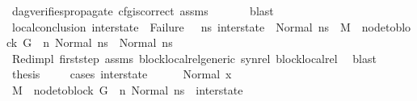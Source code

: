 \begin{isabellebody}
\ dag{\isacharunderscore}{\kern0pt}verifies{\isacharunderscore}{\kern0pt}propagate{\isacharunderscore}{\kern0pt}{}\ cfg{\isacharunderscore}{\kern0pt}is{\isacharunderscore}{\kern0pt}correct\ assms{\isacharparenleft}{\kern0pt}{}{\isacharparenright}{\kern0pt}\ \isanewline
\ \ \ \ \isamarkupfalse%
\ blast\isanewline
\ \ \isamarkupfalse%
\ local{\isacharunderscore}{\kern0pt}conclusion{\isacharcolon}{\kern0pt}\ {\isachardoublequoteopen}inter{\isacharunderscore}{\kern0pt}state\ {\isasymnoteq}\ Failure\ \ {\isasymand}\ {\isacharparenleft}{\kern0pt}{\isasymforall}ns{}{\isacharprime}{\kern0pt}{\isachardot}{\kern0pt}\ inter{\isacharunderscore}{\kern0pt}state\ {\isacharequal}{\kern0pt}\ Normal\ ns{}{\isacharprime}{\kern0pt}\ {\isasymlongrightarrow}\ {\isacharparenleft}{\kern0pt}M{\isacharcomma}{\kern0pt}{\isasymLambda}{\isacharcomma}{\kern0pt}{\isasymGamma}{\isacharcomma}{\kern0pt}{\isasymOmega}\ {\isasymturnstile}\ {\isasymlangle}{\isacharparenleft}{\kern0pt}node{\isacharunderscore}{\kern0pt}to{\isacharunderscore}{\kern0pt}block\ G\ {\isacharbang}{\kern0pt}\ n{\isacharparenright}{\kern0pt}{\isacharcomma}{\kern0pt}\ Normal\ ns{}{\isasymrangle}\ {\isacharbrackleft}{\kern0pt}{\isasymrightarrow}{\isacharbrackright}{\kern0pt}\ Normal\ ns{}{\isacharprime}{\kern0pt}{\isacharparenright}{\kern0pt}{\isacharparenright}{\kern0pt}{\isachardoublequoteclose}\ \isanewline
\ \ \ \ \isamarkupfalse%
\ Red{\isacharunderscore}{\kern0pt}impl\ first{\isacharunderscore}{\kern0pt}step\ assms{\isacharparenleft}{\kern0pt}{}{\isacharminus}{\kern0pt}{}{\isacharparenright}{\kern0pt}\ block{\isacharunderscore}{\kern0pt}local{\isacharunderscore}{\kern0pt}rel{\isacharunderscore}{\kern0pt}generic\ syn{\isacharunderscore}{\kern0pt}rel\ block{\isacharunderscore}{\kern0pt}local{\isacharunderscore}{\kern0pt}rel\ \isamarkupfalse%
\ blast\isanewline
\ \ \isamarkupfalse%
\ {\isacharquery}{\kern0pt}thesis\ \isanewline
\ \ \isamarkupfalse%
\ {\isacharparenleft}{\kern0pt}cases\ inter{\isacharunderscore}{\kern0pt}state{\isacharparenright}{\kern0pt}\isanewline
\ \ \ \ \isamarkupfalse%
\ {\isacharparenleft}{\kern0pt}Normal\ x{}{\isacharparenright}{\kern0pt}\isanewline
\ \ \ \ \isamarkupfalse%
\ {\isachardoublequoteopen}{\isacharparenleft}{\kern0pt}M{\isacharcomma}{\kern0pt}{\isasymLambda}{\isacharcomma}{\kern0pt}{\isasymGamma}{\isacharcomma}{\kern0pt}{\isasymOmega}\ {\isasymturnstile}\ {\isasymlangle}{\isacharparenleft}{\kern0pt}node{\isacharunderscore}{\kern0pt}to{\isacharunderscore}{\kern0pt}block\ G\ {\isacharbang}{\kern0pt}\ n{\isacharparenright}{\kern0pt}{\isacharcomma}{\kern0pt}\ Normal\ ns{}{\isasymrangle}\ {\isacharbrackleft}{\kern0pt}{\isasymrightarrow}{\isacharbrackright}{\kern0pt}\ inter{\isacharunderscore}{\kern0pt}state{\isacharparenright}{\kern0pt}{\isachardoublequoteclose}\ \isamarkupfalse%

\end{isabellebody}
